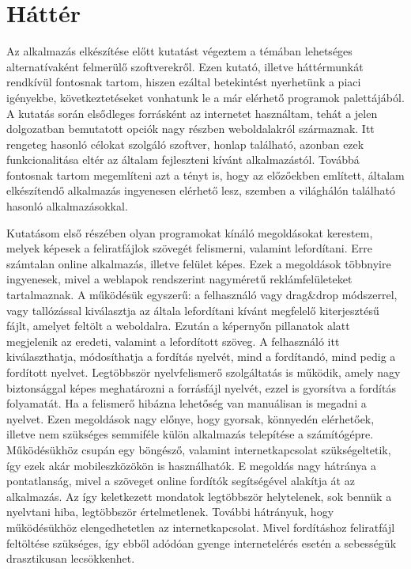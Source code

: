 \chapter{Háttér}
Az alkalmazás elkészítése előtt kutatást végeztem a témában lehetséges alternatívaként felmerülő szoftverekről. Ezen kutató, illetve háttérmunkát rendkívül fontosnak tartom, hiszen ezáltal betekintést nyerhetünk a piaci igényekbe, következtetéseket vonhatunk le a már elérhető programok palettájából. A kutatás során elsődleges forrásként az internetet használtam, tehát a jelen dolgozatban bemutatott opciók nagy részben weboldalakról származnak. Itt rengeteg hasonló célokat szolgáló szoftver, honlap található, azonban ezek funkcionalitása eltér az általam fejleszteni kívánt alkalmazástól. Továbbá fontosnak tartom megemlíteni azt a tényt is, hogy az előzőekben említett, általam elkészítendő alkalmazás ingyenesen elérhető lesz, szemben a világhálón található hasonló alkalmazásokkal.

Kutatásom első részében olyan programokat kínáló megoldásokat kerestem, melyek képesek a feliratfájlok szövegét felismerni, valamint lefordítani. Erre számtalan online alkalmazás, illetve felület képes. Ezek a megoldások többnyire ingyenesek, mivel a weblapok rendszerint nagyméretű reklámfelületeket tartalmaznak. A működésük egyszerű: a felhasználó vagy drag\&drop módszerrel, vagy tallózással kiválasztja az általa lefordítani kívánt megfelelő kiterjesztésű fájlt, amelyet feltölt a weboldalra. Ezután a képernyőn pillanatok alatt megjelenik az eredeti, valamint a lefordított szöveg. A felhasználó itt kiválaszthatja, módosíthatja a fordítás nyelvét, mind a fordítandó, mind pedig a fordított nyelvet. Legtöbbször nyelvfelismerő szolgáltatás is működik, amely nagy biztonsággal képes meghatározni a forrásfájl nyelvét, ezzel is gyorsítva a fordítás folyamatát. Ha a felismerő hibázna lehetőség van manuálisan is megadni a nyelvet. Ezen megoldások nagy előnye, hogy gyorsak, könnyedén elérhetőek, illetve nem szükséges semmiféle külön alkalmazás telepítése a számítógépre. Működésükhöz csupán egy böngésző, valamint internetkapcsolat szükségeltetik, így ezek akár mobileszközökön is használhatók. E megoldás nagy hátránya a pontatlanság, mivel a szöveget online fordítók segítségével alakítja át az alkalmazás. Az így keletkezett mondatok legtöbbször helytelenek, sok bennük a nyelvtani hiba, legtöbbször értelmetlenek. További hátrányuk, hogy működésükhöz elengedhetetlen az internetkapcsolat. Mivel fordításhoz feliratfájl feltöltése szükséges, így ebből adódóan gyenge internetelérés esetén a sebességük drasztikusan lecsökkenhet.

